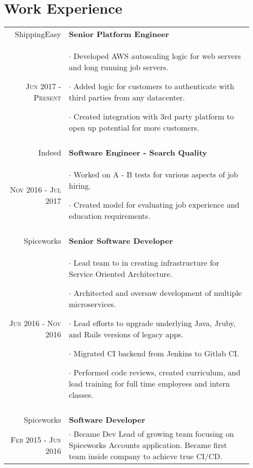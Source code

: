 \documentclass[a4paper,10pt]{article}
\begin{document}
\section{Work Experience}
\begin{tabular}{r|p{11cm}}
 ShippingEasy & \textbf{Senior Platform Engineer} \\
 \textsc{Jun 2017 - Present} &
	\footnotesize{
		$\cdot$ Developed AWS autoscaling logic for web servers and long running job servers.

		$\cdot$ Added logic for customers to authenticate with third parties from any datacenter.

		$\cdot$ Created integration with 3rd party platform to open up potential for more customers.
	}
	\\\multicolumn{2}{c}{} \\

	Indeed & \textbf{Software Engineer - Search Quality} \\
	\textsc{Nov 2016 - Jul 2017} &
	 \footnotesize{
		 $\cdot$ Worked on A - B tests for various aspects of job hiring.

		 $\cdot$ Created model for evaluating job experience and education requirements.
	 }
	 \\\multicolumn{2}{c}{} \\

	 Spiceworks & \textbf{Senior Software Developer} \\
	 \textsc{Jun 2016 - Nov 2016} &
		\footnotesize{
			$\cdot$ Lead team to in creating infrastructure for Service Oriented Architecture.

			$\cdot$ Architected and oversaw development of multiple microservices.

			$\cdot$ Lead efforts to upgrade underlying Java, Jruby, and Rails versions of legacy apps.

			$\cdot$ Migrated CI backend from Jenkins to Gitlab CI.

			$\cdot$ Performed code reviews, created curriculum, and lead training for full time employees and intern classes.
		}
		\\\multicolumn{2}{c}{} \\

	Spiceworks & \textbf{Software Developer} \\
	\textsc{Feb 2015 - Jun 2016} &
	 \footnotesize{

		 $\cdot$ Became Dev Lead of growing team focusing on Spiceworks Accounts application.
		 Became first team inside company to achieve true CI/CD.

}
\end{tabular}
\end{document}
